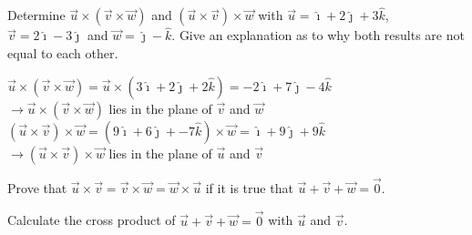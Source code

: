 \begin{Exercise}[difficulty=2] Determine $\vec{u} \times (\vec{v} \times \vec{w})$ and $(\vec{u} \times \vec{v}) \times \vec{w} $ with $\vec{u} = \hat{\imath}+2\hat{\jmath}+3\hat{k}$, $\vec{v} = 2\hat{\imath}-3\hat{\jmath}$ and $\vec{w} = \hat{\jmath}-\hat{k}$. Give an explanation as to why both results are not equal to each other.

\end{Exercise}

\begin{Answer}\phantom{}
    $\vec{u} \times (\vec{v} \times \vec{w}) = \vec{u} \times (3\hat{\imath} + 2\hat{\jmath} + 2 \hat{k}) = -2\hat{\imath}  + 7\hat{\jmath}  -4 \hat{k} $ \\[0.2cm]
    $ \rightarrow \vec{u} \times (\vec{v} \times \vec{w})$ lies in the plane of $\vec{v} $ and $\vec{w} $ \\[0.2cm]  
    $(\vec{u} \times \vec{v}) \times \vec{w}  = (9\hat{\imath} + 6\hat{\jmath} + -7 \hat{k}) \times \vec{w}   = \hat{\imath} + 9\hat{\jmath} +9 \hat{k} $\\[0.2cm]  
    $ \rightarrow (\vec{u} \times \vec{v}) \times \vec{w}$ lies in the plane of $\vec{u} $ and $\vec{v} $
\end{Answer}

\ifanalysis
\begin{Exercise}[difficulty=3] Prove that $\vec{u}\times\vec{v} = \vec{v}\times\vec{w} = \vec{w}\times\vec{u}$ if it is true that $\vec{u}+\vec{v}+\vec{w}=\vec{0}$.

\end{Exercise}

\begin{Answer}\phantom{}
    Calculate the cross product of $\vec{u}+\vec{v}+\vec{w}=\vec{0}$ with $\vec{u}$ and  $\vec{v}$.
\end{Answer}
\fi

